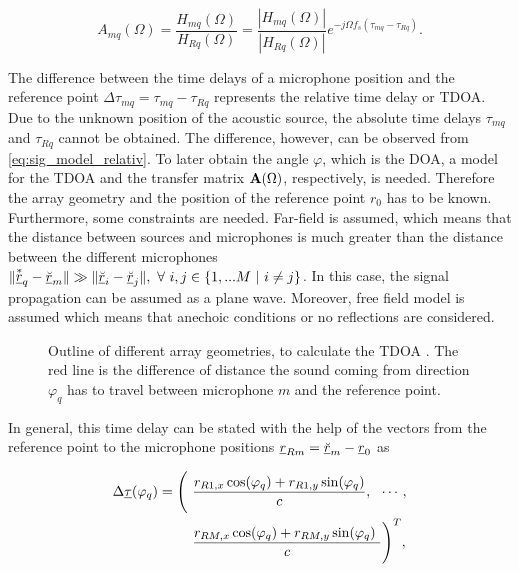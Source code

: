 \begin{equation}
A_{mq}(\Omega)= \frac{H_{mq}(\Omega)}{H_{Rq}(\Omega)} = \frac{|H_{mq}(\Omega)|}{|H_{Rq}(\Omega)|} e^{-j\Omega f_s (\tau_{mq}-\tau_{Rq})}.
\label{eq:relative_IR}
\end{equation}

The difference between the time delays of a microphone position and the reference point $\Delta\tau_{mq} = \tau_{mq}-\tau_{Rq}$ represents the relative time delay or \ac{TDOA}. \cite[Chapter~2]{madhu2010acoustic}\\
Due to the unknown position of the acoustic source, the absolute time delays $\tau_{mq}$ and $\tau_{Rq}$ cannot be obtained.
The difference, however, can be observed from \ref{eq:sig_model_relativ}.
To later obtain the angle $\varphi$, which is the \ac{DOA}, a model for the \ac{TDOA} and the transfer matrix $\mathbf{A}(\Omega)$, respectively, is needed. Therefore the array geometry and the position of the reference point $r_0$ has to be known. Furthermore, some constraints are needed. Far-field is assumed, which means that the distance between sources and microphones is much greater than the distance between the different microphones $\|\vect {\oast r}_q-\vect {\breve r}_m\| \gg \|\vect {\breve r}_{i}-\vect {\breve r}_{j}\|,\ \forall\ i,j \in \{1, ... M\ |\ i \neq j\}$. In this case, the signal propagation can be assumed as a plane wave. Moreover, free field model is assumed which means that anechoic conditions or no reflections are considered. \cite[Chapter~2]{madhu2010acoustic}
\begin{figure}[!ht]
	\hfill
	\caption{Outline of different array geometries, to calculate the \acl{TDOA} . The red line is the difference of distance the sound coming from direction $\varphi_q$ has to travel between microphone $m$ and the reference point.}
	\label{fig:DOA}
\end{figure}
In general, this time delay can be stated with the help of the vectors from the reference point to the microphone positions $\underline{r}_{Rm} = \underline{\breve r}_m - \underline{r}_0$ as

\begin{equation}
\begin{split}
\Delta\vect{\tau}(\varphi_q)=\Bigg(\ & \frac{r_{R1,x}\cos(\varphi_q)+r_{R1,y}\sin(\varphi_q)}{c},\ \ \cdots, \\ & \frac{r_{RM,x}\cos(\varphi_q)+r_{RM,y}\sin(\varphi_q)\ }{c}\Bigg)^T,\\
\end{split}
\label{eq:timedelay}
\end{equation}


